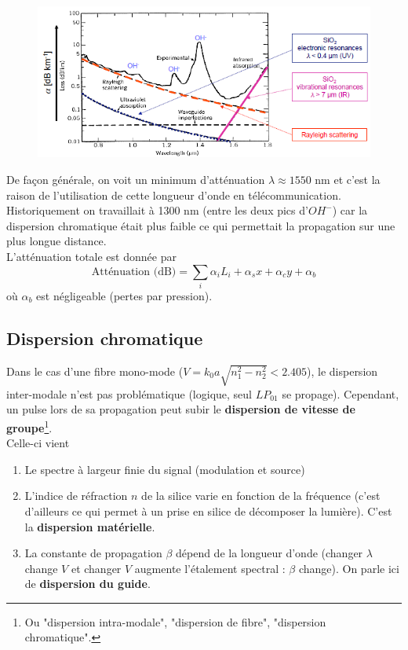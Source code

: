 	\begin{figure}
	\vspace{-5mm}
	\includegraphics[scale=0.6]{ch1/image31}
	\end{figure}
	De façon générale, on voit un minimum d'atténuation $\lambda \approx 1550$ nm et c'est la 
	raison de l'utilisation de cette longueur d'onde en télécommunication. Historiquement on 
	travaillait à 1300 nm (entre les deux pics d'$OH^-$) car la dispersion chromatique était
	plus faible ce qui permettait la propagation sur une plus longue distance.\\
	
	L'atténuation totale est donnée par
	\begin{equation}
	\text{Atténuation (dB)} = \sum_i\alpha_iL_i+\alpha_sx+\alpha_cy+\alpha_b
	\end{equation}
	où $\alpha_b$ est négligeable (pertes par pression).
	
	
	\subsection{Dispersion chromatique}
	Dans le cas d'une fibre mono-mode ($V = k_0a\sqrt{n_1^2-n_2^2} < 2.405$), le dispersion 
	inter-modale n'est pas problématique (logique, seul $LP_{01}$ se propage). Cependant, un
	pulse lors de sa propagation peut subir le \textbf{dispersion de vitesse de groupe}\footnote{
	Ou "dispersion intra-modale", "dispersion de fibre", "dispersion chromatique".}. \\
	
	Celle-ci vient 
	\begin{enumerate}
	\item Le spectre à largeur finie du signal (modulation et source)
	\item L'indice de réfraction $n$ de la silice varie en fonction de la fréquence (c'est d'ailleurs
	ce qui permet à un prise en silice de décomposer la lumière). C'est la \textbf{dispersion 
	matérielle}.
	\item La constante de propagation $\beta$ dépend de la longueur d'onde (changer $\lambda$ change
	$V$ et changer $V$ augmente l'étalement spectral : $\beta$ change). On parle ici de 
	\textbf{dispersion du guide}.
	\end{enumerate}
	
